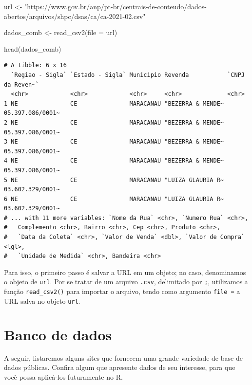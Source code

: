 \documentclass[
  brazilian,
]{book}
\newenvironment{Shaded}{\begin{snugshade}}{\end{snugshade}}
\newcommand{\AttributeTok}[1]{\textcolor[rgb]{0.77,0.63,0.00}{#1}}
\newcommand{\FunctionTok}[1]{\textcolor[rgb]{0.00,0.00,0.00}{#1}}
\newcommand{\NormalTok}[1]{#1}
\newcommand{\OtherTok}[1]{\textcolor[rgb]{0.56,0.35,0.01}{#1}}
\newcommand{\StringTok}[1]{\textcolor[rgb]{0.31,0.60,0.02}{#1}}
\begin{document}
\begin{Shaded}
\begin{Highlighting}[]
\NormalTok{url }\OtherTok{\textless{}{-}} \StringTok{"https://www.gov.br/anp/pt{-}br/centrais{-}de{-}conteudo/dados{-}abertos/arquivos/shpc/dsas/ca/ca{-}2021{-}02.csv"}

\NormalTok{dados\_comb }\OtherTok{\textless{}{-}} \FunctionTok{read\_csv2}\NormalTok{(}\AttributeTok{file =}\NormalTok{ url)}

\FunctionTok{head}\NormalTok{(dados\_comb)}
\end{Highlighting}
\end{Shaded}

\begin{verbatim}
# A tibble: 6 x 16
  `Regiao - Sigla` `Estado - Sigla` Municipio Revenda           `CNPJ da Reven~`
  <chr>            <chr>            <chr>     <chr>             <chr>           
1 NE               CE               MARACANAU "BEZERRA & MENDE~ 05.397.086/0001~
2 NE               CE               MARACANAU "BEZERRA & MENDE~ 05.397.086/0001~
3 NE               CE               MARACANAU "BEZERRA & MENDE~ 05.397.086/0001~
4 NE               CE               MARACANAU "BEZERRA & MENDE~ 05.397.086/0001~
5 NE               CE               MARACANAU "LUIZA GLAURIA R~ 03.602.329/0001~
6 NE               CE               MARACANAU "LUIZA GLAURIA R~ 03.602.329/0001~
# ... with 11 more variables: `Nome da Rua` <chr>, `Numero Rua` <chr>,
#   Complemento <chr>, Bairro <chr>, Cep <chr>, Produto <chr>,
#   `Data da Coleta` <chr>, `Valor de Venda` <dbl>, `Valor de Compra` <lgl>,
#   `Unidade de Medida` <chr>, Bandeira <chr>
\end{verbatim}

Para isso, o primeiro passo é salvar a URL em um objeto; no caso, denominamos o objeto de \texttt{url}. Por se tratar de um arquivo \texttt{.csv}, delimitado por \texttt{;}, utilizamos a função \texttt{read\_csv2()} para importar o arquivo, tendo como argumento \texttt{file\ =} a URL salva no objeto \texttt{url}.

\hypertarget{banco-de-dados}{%
\section{Banco de dados}\label{banco-de-dados}}

A seguir, listaremos alguns sites que fornecem uma grande variedade de base de dados públicas. Confira algum que apresente dados de seu interesse, para que você possa aplicá-los futuramente no R.
\end{document}

